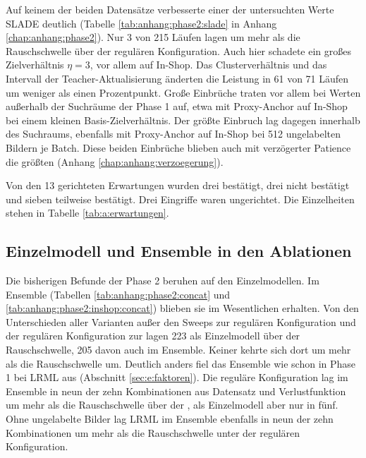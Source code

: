 Auf keinem der beiden Datensätze verbesserte einer der untersuchten Werte \ac{SLADE} deutlich (Tabelle \ref{tab:anhang:phase2:slade} in Anhang \ref{chap:anhang:phase2}). Nur 3 von 215 Läufen lagen um mehr als die Rauschschwelle über der regulären Konfiguration. Auch hier schadete ein großes Zielverhältnis $\eta=3$, vor allem auf In-Shop. Das Clusterverhältnis und das Intervall der Teacher-Aktualisierung änderten die Leistung in 61 von 71 Läufen um weniger als einen Prozentpunkt. Große Einbrüche traten vor allem bei Werten außerhalb der Suchräume der Phase 1 auf, etwa mit Proxy-Anchor auf In-Shop bei einem kleinen Basis-Zielverhältnis. Der größte Einbruch lag dagegen innerhalb des Suchraums, ebenfalls mit Proxy-Anchor auf In-Shop bei 512 ungelabelten Bildern je Batch. Diese beiden Einbrüche blieben auch mit verzögerter Patience die größten (Anhang \ref{chap:anhang:verzoegerung}).

Von den 13 gerichteten Erwartungen wurden drei bestätigt, drei nicht bestätigt und sieben teilweise bestätigt. Drei Eingriffe waren ungerichtet. Die Einzelheiten stehen in Tabelle \ref{tab:a:erwartungen}. 

\subsection{Einzelmodell und Ensemble in den Ablationen}
\label{sec:e:phase2:concat}

Die bisherigen Befunde der Phase 2 beruhen auf den Einzelmodellen. Im Ensemble (Tabellen \ref{tab:anhang:phase2:concat} und \ref{tab:anhang:phase2:inshop:concat}) blieben sie im Wesentlichen erhalten. Von den Unterschieden aller Varianten außer den Sweeps zur regulären Konfiguration und der regulären Konfiguration zur \UEBL lagen 223 als Einzelmodell über der Rauschschwelle, 205 davon auch im Ensemble. Keiner kehrte sich dort um mehr als die Rauschschwelle um. Deutlich anders fiel das Ensemble wie schon in Phase 1 bei \ac{LRML} aus (Abschnitt \ref{sec:e:faktoren}). Die reguläre Konfiguration lag im Ensemble in neun der zehn Kombinationen aus Datensatz und Verlustfunktion um mehr als die Rauschschwelle über der \UEBL, als Einzelmodell aber nur in fünf. Ohne ungelabelte Bilder lag \ac{LRML} im Ensemble ebenfalls in neun der zehn Kombinationen um mehr als die Rauschschwelle unter der regulären Konfiguration.

